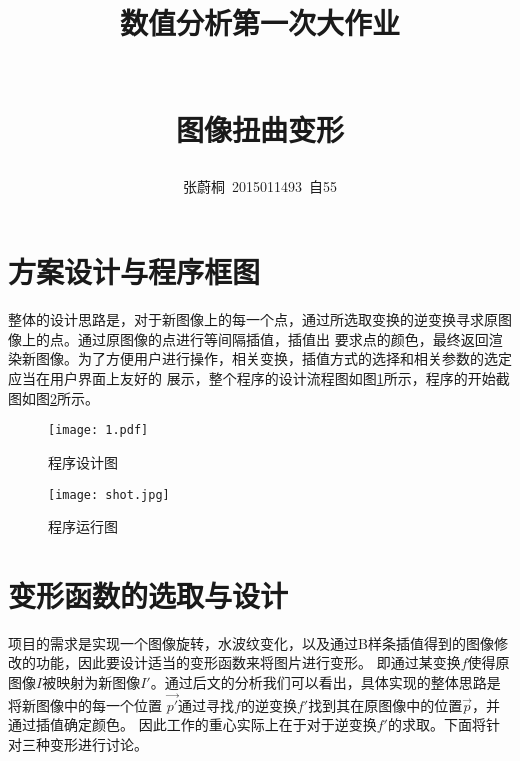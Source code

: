 \documentclass[UTF8,a4paper]{paper}\usepackage[utf8]{inputenc}\usepackage{algorithm}
\title{\begin{large}数值分析第一次大作业\end{large}\\ 图像扭曲变形}
\author{张蔚桐\ 2015011493\ 自55}
\begin{document}
\maketitle
\tableofcontents
\clearpage
\section{方案设计与程序框图}
整体的设计思路是，对于新图像上的每一个点，通过所选取变换的逆变换寻求原图像上的点。通过原图像的点进行等间隔插值，插值出
要求点的颜色，最终返回渲染新图像。为了方便用户进行操作，相关变换，插值方式的选择和相关参数的选定应当在用户界面上友好的
展示，整个程序的设计流程图如图\ref{fig1}所示，程序的开始截图如图\ref{fig2}所示。
\begin{figure}[h]
    \centering
    \texttt{[image: 1.pdf]}
    \caption{程序设计图}
    \label{fig1}
\end{figure}
\begin{figure}[h]
    \centering
    \texttt{[image: shot.jpg]}
    \caption{程序运行图}
    \label{fig2}
\end{figure}
\section{变形函数的选取与设计}
项目的需求是实现一个图像旋转，水波纹变化，以及通过B样条插值得到的图像修改的功能，因此要设计适当的变形函数来将图片进行变形。
即通过某变换$f$使得原图像$I$被映射为新图像$I'$。通过后文的分析我们可以看出，具体实现的整体思路是将新图像中的每一个位置
$\vec{p'}$通过寻找$f$的逆变换$f'$找到其在原图像中的位置$\vec{p}$，并通过插值确定颜色。
因此工作的重心实际上在于对于逆变换$f'$的求取。下面将针对三种变形进行讨论。
\end{document}
